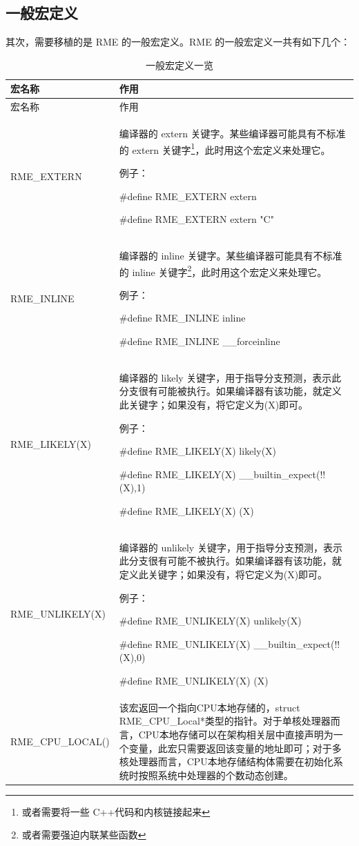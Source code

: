 \subsection{一般宏定义}\label{subsec:7-general-macro-definitions}

其次，需要移植的是 RME 的一般宏定义。RME 的一般宏定义一共有如下几个：

\begin{xltabular}{\textwidth}{@{}>{\hsize\raggedright\arraybackslash}X>{\hsize\raggedright\arraybackslash}X@{}}
\caption{一般宏定义一览}\label{tab:7-2-general-macro-definitions-overview}\\
\toprule
宏名称 & 作用\tabularnewline
\endfirsthead
\toprule
宏名称 & 作用\tabularnewline
\midrule
\endhead
\bottomrule
\endlastfoot
RME\_EXTERN\strut
 & 编译器的 extern 关键字。某些编译器可能具有不标准的 extern 关键字\footnote{或者需要将一些 C++代码和内核链接起来}，此时用这个宏定义来处理它。

例子：

\#define RME\_EXTERN extern

\#define RME\_EXTERN extern "C"\strut
\tabularnewline
RME\_INLINE\strut
 & 编译器的 inline 关键字。某些编译器可能具有不标准的 inline 关键字\footnote{或者需要强迫内联某些函数}，此时用这个宏定义来处理它。

例子：

\#define RME\_INLINE inline

\#define RME\_INLINE \_\_forceinline\strut
\tabularnewline
RME\_LIKELY(X)\strut
 & 编译器的 likely 关键字，用于指导分支预测，表示此分支很有可能被执行。如果编译器有该功能，就定义此关键字；如果没有，将它定义为(X)即可。

例子：

\#define RME\_LIKELY(X) likely(X)

\#define RME\_LIKELY(X) \_\_builtin\_expect(!!(X),1)

\#define RME\_LIKELY(X) (X)\strut
\tabularnewline
RME\_UNLIKELY(X)\strut
 & 编译器的 unlikely 关键字，用于指导分支预测，表示此分支很有可能不被执行。如果编译器有该功能，就定义此关键字；如果没有，将它定义为(X)即可。

例子：

\#define RME\_UNLIKELY(X) unlikely(X)

\#define RME\_UNLIKELY(X) \_\_builtin\_expect(!!(X),0)

\#define RME\_UNLIKELY(X) (X)\strut
\tabularnewline
RME\_CPU\_LOCAL()\strut
 & 该宏返回一个指向CPU本地存储的，struct RME\_CPU\_Local*类型的指针。对于单核处理器而言，CPU本地存储可以在架构相关层中直接声明为一个变量，此宏只需要返回该变量的地址即可；对于多核处理器而言，CPU本地存储结构体需要在初始化系统时按照系统中处理器的个数动态创建。


\end{xltabular}

